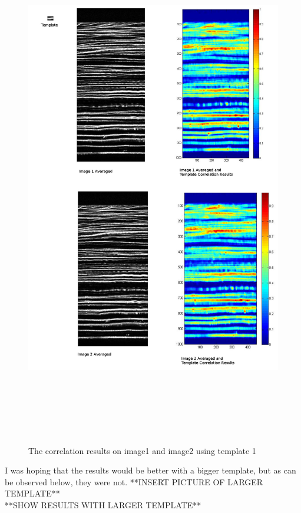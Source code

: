 \documentclass[11pt,psfig]{article}
\begin{document}
\begin{figure}[H]
\centering
\includegraphics[height=9in]{correlationResults_template1.jpg}
\caption{The correlation results on image1 and image2 using template 1}
\end{figure}
I was hoping that the results would be better with a bigger template, but as can be observed below, they were not.
**INSERT PICTURE OF LARGER TEMPLATE**\\
**SHOW RESULTS WITH LARGER TEMPLATE**\\
\\
\end{document}
